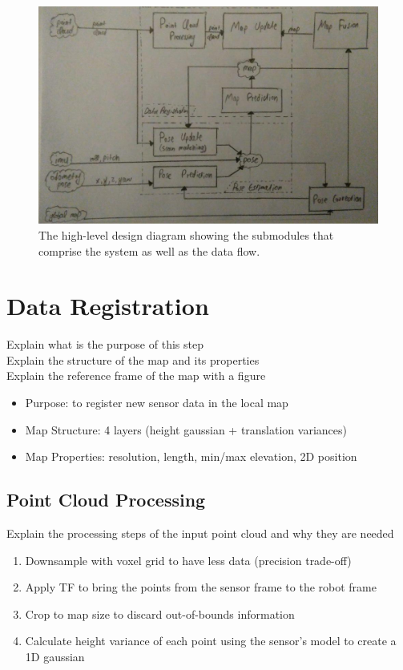\begin{figure}[th]
    \centering
    \includegraphics[scale=0.4]{Figures/high_level_design_diagram}
    \decoRule
    \caption[High Level Design Diagram]{
        The high-level design diagram showing the submodules that comprise
        the system as well as the data flow.}
    \label{fig:HLD}
\end{figure}

\section{Data Registration}

Explain what is the purpose of this step\\
Explain the structure of the map and its properties\\
Explain the reference frame of the map with a figure

\begin{itemize}
    \item Purpose: to register new sensor data in the local map
    \item Map Structure: 4 layers (height gaussian + translation variances)
    \item Map Properties: resolution, length, min/max elevation, 2D position
\end{itemize}

\subsection{Point Cloud Processing}

Explain the processing steps of the input point cloud and why they are needed

\begin{enumerate}
    \item Downsample with voxel grid to have less data (precision trade-off)
    \item Apply TF to bring the points from the sensor frame to the robot frame
    \item Crop to map size to discard out-of-bounds information
    \item Calculate height variance of each point using the sensor's model to create a 1D gaussian
\end{enumerate}

